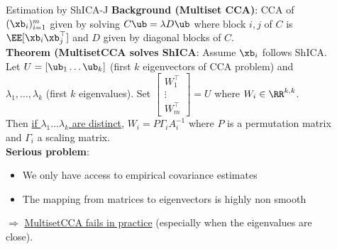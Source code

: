 \documentclass[final]{beamer}
\newlength{\sepwid}
\newlength{\onecolwid}
\newlength{\onecolwidone}
\newlength{\onecolwidtwo}
\begin{document}
\begin{frame}[t]
\begin{columns}[t]
\begin{column}{\onecolwidone}




\end{column} %

\begin{column}{\sepwid}\end{column} %

\begin{column}{\onecolwidtwo} %

  \begin{block}{Estimation by ShICA-J}
    \textbf{Background (Multiset CCA)}: CCA of $(\xb_i)_{i=1}^m$ given by solving
    $C \ub = \lambda D \ub$ where block $i, j$ of $C$ is $\EE[\xb_i \xb_j^{\top}]$
    and $D$ given by diagonal blocks of $C$. \\
    \vspace{0.5em}
    \textbf{Theorem (MultisetCCA solves ShICA}: Assume $\xb_i$ follows ShICA. 
    Let $U = [\ub_1 \dots \ub_k]$ (first $k$ eigenvectors of CCA problem) and
    $\lambda_1, \dots, \lambda_k$ (first $k$ eigenvalues). Set $\begin{bmatrix} W_1^{\top} \\ \vdots \\
      W_m^{\top} \end{bmatrix} = U$ where $W_i \in \RR^{k, k}$.  \\
    Then \underline{if $\lambda_1 \dots \lambda_k$ are distinct}, $W_i = P \Gamma_i A_i^{-1}$ where $P$ is a permutation matrix and
    $\Gamma_i$ a scaling matrix.   \\

    \vspace{0.5em}
    \textbf{Serious problem}:
    \begin{itemize}
      \item We only have access to empirical covariance
        estimates
      \item The mapping from matrices to eigenvectors is highly non smooth
    \end{itemize}
    $\Rightarrow$ \underline{MultisetCCA fails in practice} (especially when the
    eigenvalues are close). \\


\end{block}
\end{column}
\end{columns}
\end{frame}
\end{document}
